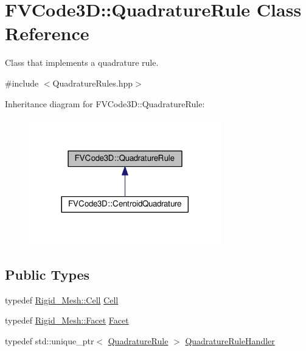 \hypertarget{classFVCode3D_1_1QuadratureRule}{}\section{F\+V\+Code3D\+:\+:Quadrature\+Rule Class Reference}
\label{classFVCode3D_1_1QuadratureRule}


Class that implements a quadrature rule.  




{\ttfamily \#include $<$Quadrature\+Rules.\+hpp$>$}



Inheritance diagram for F\+V\+Code3D\+:\+:Quadrature\+Rule\+:
\nopagebreak
\begin{figure}[H]
\begin{center}
\leavevmode
\includegraphics[width=236pt]{classFVCode3D_1_1QuadratureRule__inherit__graph}
\end{center}
\end{figure}
\subsection*{Public Types}
\begin{DoxyCompactItemize}
\item 
typedef \hyperlink{classFVCode3D_1_1Rigid__Mesh_1_1Cell}{Rigid\+\_\+\+Mesh\+::\+Cell} \hyperlink{classFVCode3D_1_1QuadratureRule_af2f37bb8e8b8c3fd7554eaacaf4e5f3c}{Cell}
\item 
typedef \hyperlink{classFVCode3D_1_1Rigid__Mesh_1_1Facet}{Rigid\+\_\+\+Mesh\+::\+Facet} \hyperlink{classFVCode3D_1_1QuadratureRule_af6e825c3626d437e50e5da733cd0ca1b}{Facet}
\item 
typedef std\+::unique\+\_\+ptr$<$ \hyperlink{classFVCode3D_1_1QuadratureRule}{Quadrature\+Rule} $>$ \hyperlink{classFVCode3D_1_1QuadratureRule_aa112834316b236e0a9072b09fd94d9cc}{Quadrature\+Rule\+Handler}
\end{DoxyCompactItemize}

